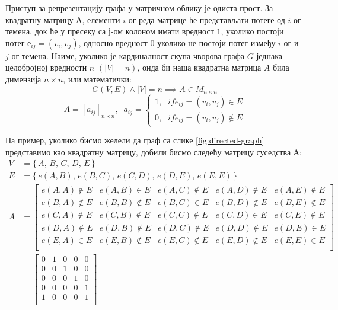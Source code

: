 \par
Приступ за репрезентацију графа у матричном облику је одиста прост. За квадратну матрицу $А$, елементи $i$-ог реда матрице ће представљати потеге од $i$-ог темена, док ће у пресеку са $ј$-ом колоном имати вредност $1$, уколико постоји потег $е_{ij} = (v_i, v_j)$, односно вредност $0$ уколико не постоји потег између $i$-ог и $j$-ог темена. Наиме, уколико је кардиналност скупа чворова графа $G$ једнака целобројној вредности $n$ $(|V| = n)$, онда би наша квадратна матрица $A$ била димензија $n\times n$, или математички:
$$G(V, E) \land |V| = n \implies A \in M_{n \times n}$$
\[
A = [a_{ij}]_{n \times n}, \;\; a_{ij} = 
\begin{cases}
\text{1}, & if e_{ij} = (v_i, v_j) \in E\\
\text{0}, & if e_{ij} = (v_i, v_j) \notin E
\end{cases}
\]


На пример, уколико бисмо желели да граф са слике \ref{fig:directed-graph} представимо као квадратну матрицу, добили бисмо следећу матрицу суседства $А$:
\[
\begin{split}
V &= \{\, A,\, B,\, C,\, D,\, E\, \} \\
E &= \{\, e(A, B),\, e(B, C),\, e(C, D),\, e(D, E),\, e(E, E)\, \} \\
A &=
\begin{bmatrix}
e(A, A) \notin E & e(A, B) \in E & e(A, C) \notin E & e(A, D) \notin E & e(A, E) \notin E \\
e(B, A) \notin E & e(B, B) \notin E & e(B, C) \in E & e(B, D) \notin E & e(B, E) \notin E \\
e(C, A) \notin E & e(C, B) \notin E & e(C, C) \notin E & e(C, D) \in E & e(C, E) \notin E \\
e(D, A) \notin E & e(D, B) \notin E & e(D, C) \notin E & e(D, D) \notin E & e(D, E) \in E \\
e(E, A) \in E & e(E, B) \notin E & e(E, C) \notin E & e(E, D) \notin E & e(E, E) \in E \\
\end{bmatrix} \\
&=
\begin{bmatrix}
0 & 1 & 0 & 0 & 0 \\
0 & 0 & 1 & 0 & 0 \\
0 & 0 & 0 & 1 & 0 \\
0 & 0 & 0 & 0 & 1 \\
1 & 0 & 0 & 0 & 1 \\
\end{bmatrix}
\end{split}
\]

